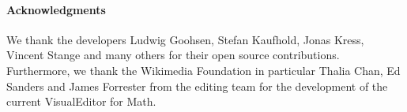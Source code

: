 \documentclass{llncs}
\begin{document}
\paragraph*{Acknowledgments} We thank the developers Ludwig Goohsen, Stefan Kaufhold, Jonas Kress, Vincent Stange and many others for their open source contributions.
 Furthermore, we thank the Wikimedia Foundation in particular Thalia Chan, Ed Sanders and James Forrester from the editing team for the development of the current VisualEditor for Math.
\printbibliography[keyword=primary]
\end{document}
